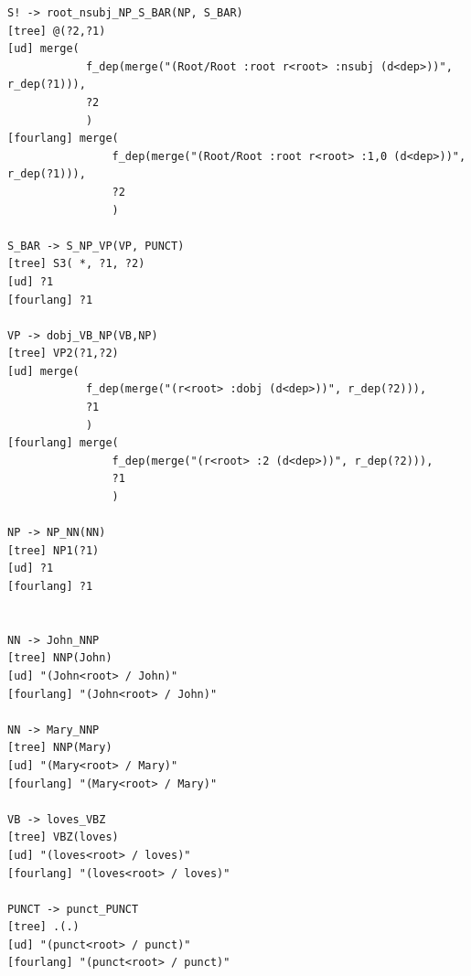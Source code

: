 \begin{verbatim}
S! -> root_nsubj_NP_S_BAR(NP, S_BAR)
[tree] @(?2,?1)
[ud] merge(
			f_dep(merge("(Root/Root :root r<root> :nsubj (d<dep>))", r_dep(?1))),
			?2
			)
[fourlang] merge(
				f_dep(merge("(Root/Root :root r<root> :1,0 (d<dep>))", r_dep(?1))),
				?2
				)

S_BAR -> S_NP_VP(VP, PUNCT)
[tree] S3( *, ?1, ?2)
[ud] ?1
[fourlang] ?1

VP -> dobj_VB_NP(VB,NP)
[tree] VP2(?1,?2)
[ud] merge(
			f_dep(merge("(r<root> :dobj (d<dep>))", r_dep(?2))),
			?1
			)
[fourlang] merge(
				f_dep(merge("(r<root> :2 (d<dep>))", r_dep(?2))),
				?1
				)

NP -> NP_NN(NN)
[tree] NP1(?1)
[ud] ?1
[fourlang] ?1


NN -> John_NNP
[tree] NNP(John)
[ud] "(John<root> / John)"
[fourlang] "(John<root> / John)"

NN -> Mary_NNP
[tree] NNP(Mary)
[ud] "(Mary<root> / Mary)"
[fourlang] "(Mary<root> / Mary)"

VB -> loves_VBZ
[tree] VBZ(loves)
[ud] "(loves<root> / loves)"
[fourlang] "(loves<root> / loves)"

PUNCT -> punct_PUNCT
[tree] .(.)
[ud] "(punct<root> / punct)"
[fourlang] "(punct<root> / punct)"
\end{verbatim}

